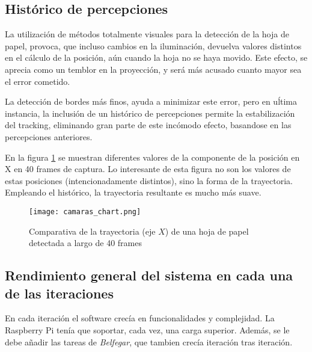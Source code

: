 

\subsection{Histórico de percepciones}
La utilización de métodos totalmente visuales para la detección de la hoja de papel, provoca, que incluso cambios en la iluminación, devuelva valores distintos en el cálculo de la posición, aún cuando la hoja no se haya movido. Este efecto, se aprecia como un temblor en la proyección, y será más acusado cuanto mayor sea el error cometido.

La detección de bordes más finos, ayuda a minimizar este error, pero en uĺtima instancia, la inclusión de un histórico de percepciones permite la estabilización del tracking, eliminando gran parte de este incómodo efecto, basandose en las percepciones anteriores.

En la figura \ref{fig:historic_chart} se muestran diferentes valores de la componente de la posición en X en 40 frames de captura. Lo interesante de esta figura no son los valores de estas posiciones (intencionadamente distintos), sino la forma de la trayectoria. Empleando el histórico, la trayectoria resultante es mucho más suave.

\begin{figure}
  \begin{center}
    \texttt{[image: camaras\_chart.png]}
    \caption{Comparativa de la trayectoria (eje $X$) de una hoja de papel detectada a largo de 40 frames}
    \label{fig:historic_chart}
  \end{center}
\end{figure}

\subsection{Rendimiento general del sistema en cada una de las iteraciones}
En cada iteración el software crecía en funcionalidades y complejidad. La Raspberry Pi tenía que soportar, cada vez, una carga superior. Además, se le debe añadir las tareas de \textit{Belfegar}, que tambien crecía iteración tras iteración.

